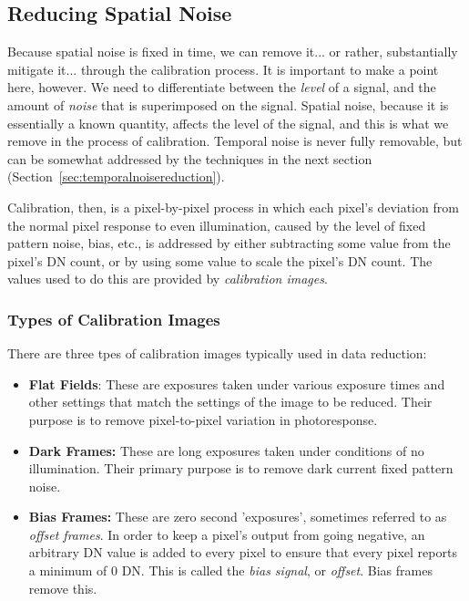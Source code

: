 \documentclass[10pt]{article}
\begin{document}
\subsection{Reducing Spatial Noise}
\label{sec:spatialnoisereduction}

Because spatial noise is fixed in time, we can remove it... or rather, substantially mitigate it... through the calibration process. It is important to make a point here, however. We need to differentiate between the \emph{level} of a signal, and the amount of \emph{noise} that is superimposed on the signal. Spatial noise, because it is essentially a known quantity, affects the level of the signal, and this is what we remove in the process of calibration. Temporal noise is never fully removable, but can be somewhat addressed by the techniques in the next section (Section~\ref{sec:temporalnoisereduction}).

Calibration, then, is a pixel-by-pixel process in which each pixel's deviation from the normal pixel response to even illumination, caused by the level of fixed pattern noise, bias, etc., is addressed by either subtracting some value from the pixel's DN count, or by using some value to scale the pixel's DN count. The values used to do this are provided by \emph{calibration images}. 

\subsubsection{Types of Calibration Images}

There are three tpes of calibration images typically used in data reduction:

\begin{itemize}[noitemsep]
    \item \textbf{Flat Fields}: These are exposures taken under various exposure times and other settings that match the settings of the image to be reduced. Their purpose is to remove pixel-to-pixel variation in photoresponse.
    \item \textbf{Dark Frames:} These are long exposures taken under conditions of no illumination. Their primary purpose is to remove dark current fixed pattern noise.
    \item \textbf{Bias Frames:} These are zero second 'exposures', sometimes referred to as \emph{offset frames}. In order to keep a pixel's output from going negative, an arbitrary DN value is added to every pixel to ensure that every pixel reports a minimum  of 0 DN. This is called the \emph{bias signal}, or \emph{offset}. Bias frames remove this.
\end{itemize}
\end{document}

